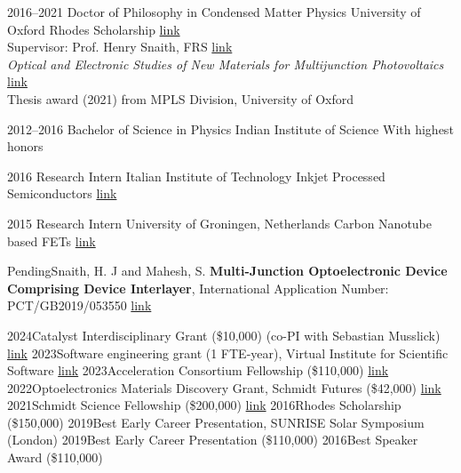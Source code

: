 \documentclass{scrartcl}
\begin{document}
\begin{entrylist}
\entry
{2016--2021}
{Doctor of Philosophy in Condensed Matter Physics}
{University of Oxford}
{Rhodes Scholarship \href{https://www.rhodeshouse.ox.ac.uk/scholars/rhodes-scholars-class-of-2016/suhas-mahesh/}{link}\\
Supervisor: Prof. Henry Snaith, FRS \href{https://scholar.google.com/citations?user=I2D3pUMAAAAJ&hl=en}{link}\\
\emph{Optical and Electronic Studies of New Materials for Multijunction Photovoltaics }\href{http://dx.doi.org/10.5287/bodleian:mNArOK77N}{link}\\
Thesis award (2021) from MPLS Division, University of Oxford \\
}

\entry
{2012--2016}
{Bachelor of Science in Physics}
{Indian Institute of Science}
{With highest honors}

\entry
{2016}
{Research Intern}
{Italian Institute of Technology}
{Inkjet Processed Semiconductors \href{https://scholar.google.it/citations?user=f3suRUkAAAAJ&hl=en}{link}}

\entry
{2015}
{Research Intern}
{University of Groningen, Netherlands}
{Carbon Nanotube based FETs \href{https://scholar.google.com/citations?user=Cw22GB8AAAAJ&hl=en}{link}}
\end{entrylist}

\bigskip
{}\bigskip


\begin{entrylist}
\splitentry
{Pending}{Snaith, H. J and Mahesh, S. \textbf{Multi-Junction Optoelectronic Device Comprising Device Interlayer}, International Application Number: PCT/GB2019/053550 \href{https://patents.google.com/patent/WO2020120991A1/}{link} }{}

\end{entrylist} 



\begin{entrylist}
{2024}{Catalyst Interdisciplinary Grant (\$10,000) (co-PI with Sebastian Musslick) \href{https://schmidtsciencefellows.org/news/2023-catalyst-grants-awardees/}{link} }{}
{2023}{Software engineering grant (1 FTE-year), Virtual Institute for Scientific Software \href{https://www.schmidtfutures.com/our-work/virtual-institute-for-scientific-software/}{link} }{}
{2023}{Acceleration Consortium Fellowship (\$110,000) \href{https://acceleration.utoronto.ca/}{link} }{}
{2022}{Optoelectronics Materials Discovery Grant, Schmidt Futures (\$42,000) \href{https://www.schmidtfutures.com/}{link} }{}
{2021}{Schmidt Science Fellowship (\$200,000) \href{https://schmidtsciencefellows.org/}{link} }{}
{2016}{Rhodes Scholarship (\$150,000)}{}
{2019}{Best Early Career Presentation, SUNRISE Solar Symposium (London)}{}
{2019}{Best Early Career Presentation (\$110,000)}{}
{2016}{Best Speaker Award (\$110,000)}{}
\end{entrylist} 
\end{document}
